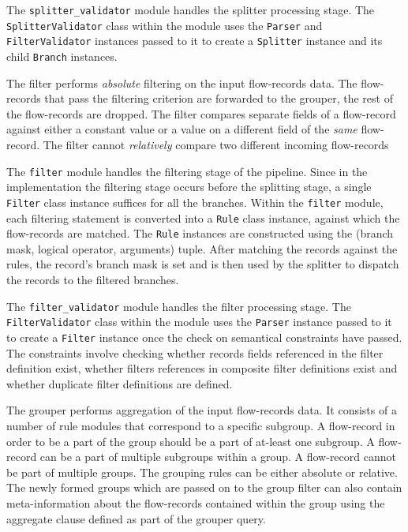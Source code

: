 The \texttt{splitter\_validator} module handles the splitter processing stage.
The  \texttt{SplitterValidator} class within the
module uses the \texttt{Parser} and \texttt{FilterValidator} instances passed
to it to create a \texttt{Splitter} instance and its child \texttt{Branch}
instances.

The filter performs \emph{absolute} filtering on the input flow-records data.
The flow-records that pass the filtering criterion are forwarded to the
grouper,  the rest of the flow-records are dropped. The
filter compares separate fields of a flow-record against either a constant
value or a value on a different field of the \emph{same} flow-record. The
filter cannot \emph{relatively} compare two different incoming flow-records

The \texttt{filter} module handles the filtering stage of the pipeline. Since
in the implementation the filtering stage occurs before the splitting stage, a
single \texttt{Filter} class instance suffices for all the branches. Within
the \texttt{filter} module, each filtering statement is converted into a
\texttt{Rule}  class instance, against which
the flow-records are matched. The \texttt{Rule} instances are constructed
using the (branch mask, logical operator, arguments) tuple. After matching the
records against the rules, the record's branch mask is set and is then used by
the splitter to dispatch the records to the filtered branches.

The \texttt{filter\_validator} module handles the filter processing stage. The
\texttt{FilterValidator} class within the module uses the \texttt{Parser}
instance passed to it to create a \texttt{Filter} instance once the check on
semantical constraints  have passed. The
constraints involve checking whether records fields referenced in the filter
definition exist, whether filters references in composite filter definitions
exist and whether duplicate filter definitions are defined.

The grouper performs aggregation of the input flow-records data. It consists
of a number of rule modules that correspond to a specific subgroup. A
flow-record in order to be a part of the group should be a part of at-least
one subgroup. A flow-record can be a part of multiple subgroups within a
 group. A flow-record cannot be part of multiple groups.
The grouping rules can be either absolute or relative. The newly formed groups
which are passed on to the group filter can also contain meta-information
about the flow-records contained within the group using the aggregate clause
defined as part of the grouper query.

